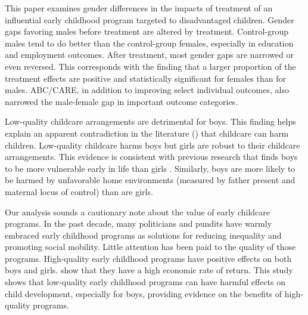 This paper examines gender differences in the impacts of treatment of an influential early childhood program targeted to disadvantaged children. Gender gaps favoring males before treatment are altered by treatment. Control-group males tend to do better than the control-group females, especially in education and employment outcomes. After treatment, most gender gaps are narrowed or even reversed. This corresponds with the finding that a larger proportion of the treatment effects are positive and statistically significant for females than for males. ABC/CARE, in addition to improving select individual outcomes, also narrowed the male-female gap in important outcome categories.

Low-quality childcare arrangements are detrimental for boys. This finding helps explain an apparent contradiction in the literature (\citet{Baker_Gruber_etal_2008_JPE,Baker_Gruber_Milligan_2015_Noncog_Defects,Kottelenberg-Lehrer_2014_Gender-Effects}) that childcare can harm children. Low-quality childcare harms boys but girls are robust to their childcare arrangements. This evidence is consistent with previous research that finds boys to be more vulnerable early in life than girls \citep{golding2016psychology}. Similarly, boys are more likely to be harmed by unfavorable home environments (measured by father present and maternal locus of control) than are girls.

Our analysis sounds a cautionary note about the value of early childcare programs. In the past decade, many politicians and pundits have warmly embraced early childhood programs as solutions for reducing inequality and promoting social mobility. Little attention has been paid to the quality of those programs. High-quality early childhood programs have positive effects on both boys and girls. \cite{Garcia_Heckman_Leaf_etal_2017_Comp_CBA_Unpublished} show that they have a high economic rate of return. This study shows that low-quality early childhood programs can have harmful effects on child development, especially for boys, providing evidence on the benefits of high-quality programs.

